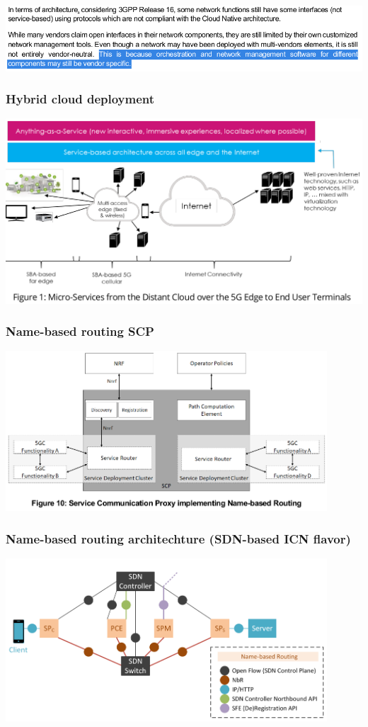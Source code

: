 \documentclass{beamer}
\begin{document}
\begin{frame}
  \center
  \includegraphics[width=\textwidth]{images/cn-challenges}
\end{frame}

\begin{frame}
  \frametitle{Hybrid cloud deployment}
  \center
  \includegraphics[width=\textwidth]{images/sbi-hybridcloud}
\end{frame}

\begin{frame}
  \frametitle{Name-based routing SCP}
  \center
  \includegraphics[width=0.9\textwidth]{images/scp-nbr-deploy}
\end{frame}
\begin{frame}
  \frametitle{Name-based routing architechture (SDN-based ICN flavor)}
  \center
  \includegraphics[width=0.9\textwidth]{images/nbr}
\end{frame}
\end{document}
